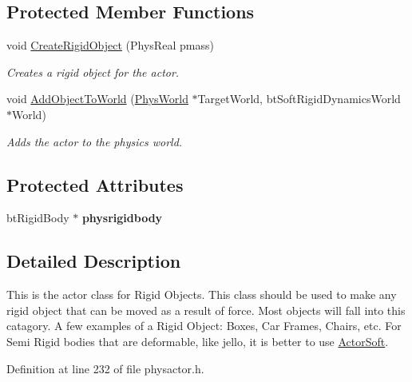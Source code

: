 \subsection*{Protected Member Functions}
\begin{DoxyCompactItemize}
\item 
void \hyperlink{classActorRigid_ac651eed187c3cb912bc7f294f0b42ad1}{CreateRigidObject} (PhysReal pmass)
\begin{DoxyCompactList}\small\item\em Creates a rigid object for the actor. \item\end{DoxyCompactList}\item 
void \hyperlink{classActorRigid_ac6d7e05944623329f0c2140c19e2c49e}{AddObjectToWorld} (\hyperlink{classPhysWorld}{PhysWorld} $\ast$TargetWorld, btSoftRigidDynamicsWorld $\ast$World)
\begin{DoxyCompactList}\small\item\em Adds the actor to the physics world. \item\end{DoxyCompactList}\end{DoxyCompactItemize}
\subsection*{Protected Attributes}
\begin{DoxyCompactItemize}
\item 
\hypertarget{classActorRigid_a6942757e081b5261dbf266f197dc56ab}{
btRigidBody $\ast$ {\bfseries physrigidbody}}
\label{d5/d10/classActorRigid_a6942757e081b5261dbf266f197dc56ab}

\end{DoxyCompactItemize}


\subsection{Detailed Description}
This is the actor class for Rigid Objects. This class should be used to make any rigid object that can be moved as a result of force. Most objects will fall into this catagory. A few examples of a Rigid Object: Boxes, Car Frames, Chairs, etc. For Semi Rigid bodies that are deformable, like jello, it is better to use \hyperlink{classActorSoft}{ActorSoft}. 

Definition at line 232 of file physactor.h.

